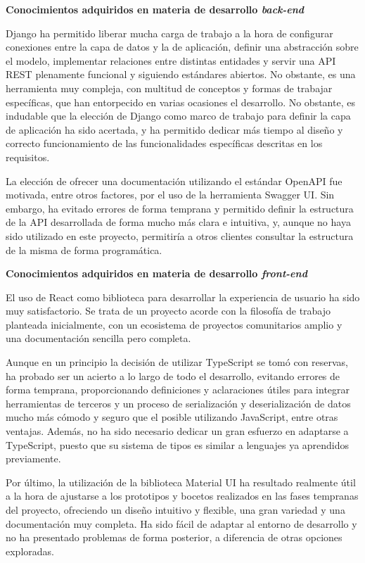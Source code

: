 \documentclass[10pt, a4paper]{aqademic}
\begin{document}
\textbf{Conocimientos adquiridos en materia de desarrollo \textit{back-end}}

Django ha permitido liberar mucha carga de trabajo a la hora de configurar conexiones entre la capa de datos y la de aplicación, definir una abstracción sobre el modelo, implementar relaciones entre distintas entidades y servir una API REST plenamente funcional y siguiendo estándares abiertos. No obstante, es una herramienta muy compleja, con multitud de conceptos y formas de trabajar específicas, que han entorpecido en varias ocasiones el desarrollo. No obstante, es indudable que la elección de Django como marco de trabajo para definir la capa de aplicación ha sido acertada, y ha permitido dedicar más tiempo al diseño y correcto funcionamiento de las funcionalidades específicas descritas en los requisitos.

La elección de ofrecer una documentación utilizando el estándar OpenAPI fue motivada, entre otros factores, por el uso de la herramienta Swagger UI. Sin embargo, ha evitado errores de forma temprana y permitido definir la estructura de la API desarrollada de forma mucho más clara e intuitiva, y, aunque no haya sido utilizado en este proyecto, permitiría a otros clientes consultar la estructura de la misma de forma programática.

\bigskip

\textbf{Conocimientos adquiridos en materia de desarrollo \textit{front-end}}

El uso de React como biblioteca para desarrollar la experiencia de usuario ha sido muy satisfactorio. Se trata de un proyecto acorde con la filosofía de trabajo planteada inicialmente, con un ecosistema de proyectos comunitarios amplio y una documentación sencilla pero completa.

Aunque en un principio la decisión de utilizar TypeScript se tomó con reservas, ha probado ser un acierto a lo largo de todo el desarrollo, evitando errores de forma temprana, proporcionando definiciones y aclaraciones útiles para integrar herramientas de terceros y un proceso de serialización y deserialización de datos mucho más cómodo y seguro que el posible utilizando JavaScript, entre otras ventajas. Además, no ha sido necesario dedicar un gran esfuerzo en adaptarse a TypeScript, puesto que su sistema de tipos es similar a lenguajes ya aprendidos previamente. 

Por último, la utilización de la biblioteca Material UI ha resultado realmente útil a la hora de ajustarse a los prototipos y bocetos realizados en las fases tempranas del proyecto, ofreciendo un diseño intuitivo y flexible, una gran variedad y una documentación muy completa. Ha sido fácil de adaptar al entorno de desarrollo y no ha presentado problemas de forma posterior, a diferencia de otras opciones exploradas.
\end{document}
